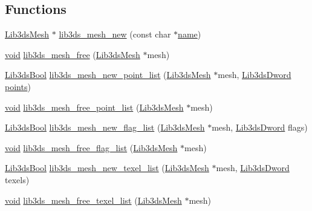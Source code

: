 \subsection*{Functions}
\begin{DoxyCompactItemize}
\item 
\hyperlink{struct_lib3ds_mesh}{Lib3ds\-Mesh} $\ast$ \hyperlink{group__mesh_ga7edcae326ee09f46d3b52c99c2aa9e24}{lib3ds\-\_\-mesh\-\_\-new} (const char $\ast$\hyperlink{glext_8h_ad977737dfc9a274a62741b9500c49a32}{name})
\item 
\hyperlink{group___u_a_v_objects_plugin_ga444cf2ff3f0ecbe028adce838d373f5c}{void} \hyperlink{group__mesh_gadadcac46515770b081c8b8771e157ccc}{lib3ds\-\_\-mesh\-\_\-free} (\hyperlink{struct_lib3ds_mesh}{Lib3ds\-Mesh} $\ast$mesh)
\item 
\hyperlink{types_8h_a89dd7398a9ebbbf28011f8c32df67ad3}{Lib3ds\-Bool} \hyperlink{group__mesh_gafe60f3c7105b3bc41d4c94a84cb1a0a2}{lib3ds\-\_\-mesh\-\_\-new\-\_\-point\-\_\-list} (\hyperlink{struct_lib3ds_mesh}{Lib3ds\-Mesh} $\ast$mesh, \hyperlink{types_8h_a299c9663303144c562f6bd92c2f273d3}{Lib3ds\-Dword} \hyperlink{glext_8h_ae75d9f560170dfeaadc8718c87f5fbec}{points})
\item 
\hyperlink{group___u_a_v_objects_plugin_ga444cf2ff3f0ecbe028adce838d373f5c}{void} \hyperlink{group__mesh_ga9f7920b532154eb01e1060d8fc3e017b}{lib3ds\-\_\-mesh\-\_\-free\-\_\-point\-\_\-list} (\hyperlink{struct_lib3ds_mesh}{Lib3ds\-Mesh} $\ast$mesh)
\item 
\hyperlink{types_8h_a89dd7398a9ebbbf28011f8c32df67ad3}{Lib3ds\-Bool} \hyperlink{group__mesh_gaa62e7733106927763525c466a4fde142}{lib3ds\-\_\-mesh\-\_\-new\-\_\-flag\-\_\-list} (\hyperlink{struct_lib3ds_mesh}{Lib3ds\-Mesh} $\ast$mesh, \hyperlink{types_8h_a299c9663303144c562f6bd92c2f273d3}{Lib3ds\-Dword} flags)
\item 
\hyperlink{group___u_a_v_objects_plugin_ga444cf2ff3f0ecbe028adce838d373f5c}{void} \hyperlink{group__mesh_ga9f3f6af9176319e3d892bc42e10a53d1}{lib3ds\-\_\-mesh\-\_\-free\-\_\-flag\-\_\-list} (\hyperlink{struct_lib3ds_mesh}{Lib3ds\-Mesh} $\ast$mesh)
\item 
\hyperlink{types_8h_a89dd7398a9ebbbf28011f8c32df67ad3}{Lib3ds\-Bool} \hyperlink{group__mesh_ga3ddeb369b1102dde6bb74f417fd0e69d}{lib3ds\-\_\-mesh\-\_\-new\-\_\-texel\-\_\-list} (\hyperlink{struct_lib3ds_mesh}{Lib3ds\-Mesh} $\ast$mesh, \hyperlink{types_8h_a299c9663303144c562f6bd92c2f273d3}{Lib3ds\-Dword} texels)
\item 
\hyperlink{group___u_a_v_objects_plugin_ga444cf2ff3f0ecbe028adce838d373f5c}{void} \hyperlink{group__mesh_ga3aa50465569d0197e75e029b564c59ca}{lib3ds\-\_\-mesh\-\_\-free\-\_\-texel\-\_\-list} (\hyperlink{struct_lib3ds_mesh}{Lib3ds\-Mesh} $\ast$mesh)

\end{DoxyCompactItemize}
